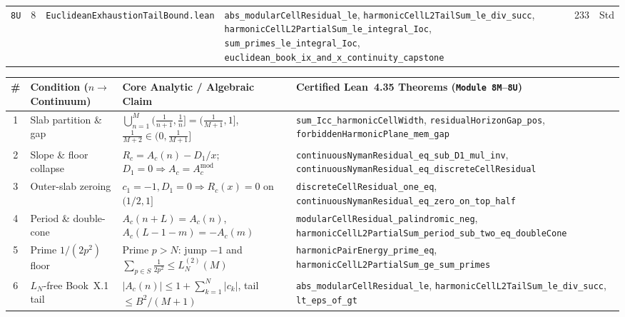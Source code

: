 \documentclass[11pt,a4paper]{article}
\theoremstyle{definition}
\begin{document}
\begin{longtable}{@{}ll>{\raggedright\arraybackslash}p{5.2cm}>{\raggedright\arraybackslash}p{6.8cm}cc@{}}
\texttt{8U} & 8 & \texttt{Euclidean\allowbreak Exhaustion\allowbreak Tail\allowbreak Bound.lean} & \texttt{abs\_\allowbreak modularCellResidual\_\allowbreak le}, \texttt{harmonicCellL2TailSum\_\allowbreak le\_\allowbreak div\_\allowbreak succ}, \texttt{harmonicCellL2PartialSum\_\allowbreak le\_\allowbreak integral\_\allowbreak Ioc}, \texttt{sum\_\allowbreak primes\_\allowbreak le\_\allowbreak integral\_\allowbreak Ioc}, \texttt{euclidean\_\allowbreak book\_\allowbreak ix\_\allowbreak and\_\allowbreak x\_\allowbreak continuity\_\allowbreak capstone} & 233 & Std \\
\end{longtable}
\normalsize

\begin{table}[ht]
\centering
\scriptsize
\setlength{\tabcolsep}{3.0pt}
\begin{tabular}{@{}cl>{\raggedright\arraybackslash}p{4.3cm}>{\raggedright\arraybackslash}p{7.3cm}@{}}
\toprule
\# & Condition ($n \to$ Continuum) & Core Analytic / Algebraic Claim & Certified Lean~4.35 Theorems (\texttt{Module~8M}--\texttt{8U}) \\
\midrule
1 & Slab partition \& gap & $\bigcup_{n=1}^M \bigl(\tfrac{1}{n+1},\tfrac{1}{n}\bigr] = \bigl(\tfrac{1}{M+1},1\bigr]$, $\frac{1}{M+2} \in (0,\tfrac{1}{M+1}]$ & \texttt{sum\_Icc\_\allowbreak harmonicCellWidth}, \texttt{residualHorizonGap\_\allowbreak pos}, \texttt{forbiddenHarmonicPlane\_\allowbreak mem\_gap} \\
2 & Slope \& floor collapse & $R_c = A_c(n) - D_1/x$; $D_1 = 0 \Rightarrow A_c = A_c^{\mathrm{mod}}$ & \texttt{continuousNymanResidual\_\allowbreak eq\_sub\_D1\_\allowbreak mul\_inv}, \texttt{continuousNymanResidual\_\allowbreak eq\_discreteCellResidual} \\
3 & Outer-slab zeroing & $c_1 = -1, D_1 = 0 \Rightarrow R_c(x) = 0$ on $(1/2, 1]$ & \texttt{discreteCellResidual\_one\_eq}, \texttt{continuousNymanResidual\_\allowbreak eq\_zero\_on\_top\_half} \\
4 & Period \& double-cone & $A_c(n+L) = A_c(n)$, $A_c(L-1-m) = -A_c(m)$ & \texttt{modularCellResidual\_\allowbreak palindromic\_neg}, \texttt{harmonicCellL2PartialSum\_\allowbreak period\_sub\_two\_\allowbreak eq\_doubleCone} \\
5 & Prime $1/(2p^2)$ floor & Prime $p > N$: jump $-1$ and $\sum_{p \in S}\frac{1}{2p^2} \le L_N^{(2)}(M)$ & \texttt{harmonicPairEnergy\_\allowbreak prime\_eq}, \texttt{harmonicCellL2PartialSum\_\allowbreak ge\_sum\_primes} \\
6 & $L_N$-free Book~X.1 tail & $|A_c(n)| \le 1 + \sum_{k=1}^N |c_k|$, tail $\le B^2/(M+1)$ & \texttt{abs\_modularCellResidual\_\allowbreak le}, \texttt{harmonicCellL2TailSum\_\allowbreak le\_div\_succ}, \texttt{lt\_eps\_of\_gt} \\

\end{tabular}
\end{table}
\end{document}
